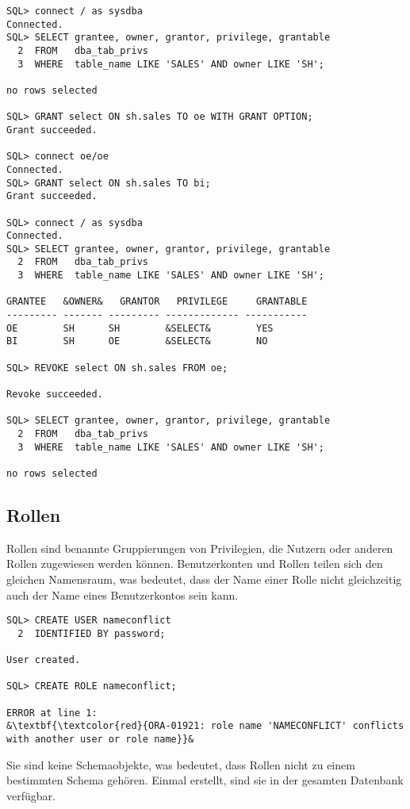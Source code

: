 \clearpage
          \begin{lstlisting}[caption={Entziehen von Objektprivilegien},label=admin245,language=oracle_sql,alsolanguage=sqlplus]
SQL> connect / as sysdba
Connected.
SQL> SELECT grantee, owner, grantor, privilege, grantable
  2  FROM   dba_tab_privs
  3  WHERE  table_name LIKE 'SALES' AND owner LIKE 'SH';

no rows selected

SQL> GRANT select ON sh.sales TO oe WITH GRANT OPTION;
Grant succeeded.

SQL> connect oe/oe
Connected.
SQL> GRANT select ON sh.sales TO bi;
Grant succeeded.

SQL> connect / as sysdba
Connected.
SQL> SELECT grantee, owner, grantor, privilege, grantable
  2  FROM   dba_tab_privs
  3  WHERE  table_name LIKE 'SALES' AND owner LIKE 'SH';

GRANTEE   &OWNER&   GRANTOR   PRIVILEGE     GRANTABLE
--------- ------- --------- ------------- -----------
OE        SH      SH        &SELECT&        YES
BI        SH      OE        &SELECT&        NO

SQL> REVOKE select ON sh.sales FROM oe;

Revoke succeeded.

SQL> SELECT grantee, owner, grantor, privilege, grantable
  2  FROM   dba_tab_privs
  3  WHERE  table_name LIKE 'SALES' AND owner LIKE 'SH';

no rows selected
          \end{lstlisting}
          \begin{literaturinternet}
            \item \cite{BABCIHGB}
          \end{literaturinternet}
      \subsection{Rollen}
        Rollen sind benannte Gruppierungen von Privilegien, die Nutzern oder anderen Rollen zugewiesen werden k\"onnen. Benutzerkonten und Rollen teilen sich den gleichen Namensraum, was bedeutet, dass der Name einer Rolle nicht gleichzeitig auch der Name eines Benutzerkontos sein kann.
        \begin{lstlisting}[caption={Rollen und Benutzerkonten teilen sich den gleichen Namensraum},label=admin246,language=oracle_sql]
SQL> CREATE USER nameconflict
  2  IDENTIFIED BY password;

User created.

SQL> CREATE ROLE nameconflict;

ERROR at line 1:
&\textbf{\textcolor{red}{ORA-01921: role name 'NAMECONFLICT' conflicts with another user or role name}}&
        \end{lstlisting}
        Sie sind keine Schemaobjekte, was bedeutet, dass Rollen nicht zu einem bestimmten Schema geh\"oren. Einmal erstellt, sind sie in der gesamten Datenbank verf\"ugbar.
